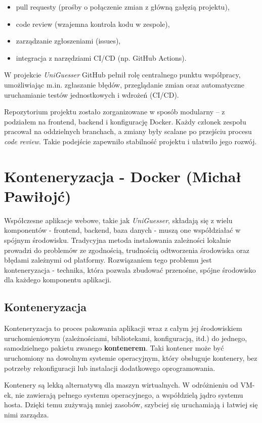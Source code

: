 \begin{itemize}
    \item pull requesty (prośby o połączenie zmian z główną gałęzią projektu),
    \item code review (wzajemna kontrola kodu w zespole),
    \item zarządzanie zgłoszeniami (issues),
    \item integracja z narzędziami CI/CD (np. GitHub Actions).
\end{itemize}

W projekcie \textit{UniGuesser} GitHub pełnił rolę centralnego punktu współpracy, umożliwiając m.in. zgłaszanie błędów, przeglądanie zmian oraz automatyczne uruchamianie testów jednostkowych i wdrożeń (CI/CD).

Repozytorium projektu zostało zorganizowane w sposób modularny – z podziałem na frontend, backend i konfigurację Docker. Każdy członek zespołu pracował na oddzielnych branchach, a zmiany były scalane po przejściu procesu \textit{code review}. Takie podejście zapewniło stabilność projektu i ułatwiło jego rozwój.

\section{Konteneryzacja - Docker (Michał Pawiłojć)}

Współczesne aplikacje webowe, takie jak \textit{UniGuesser}, składają się z wielu komponentów - frontend, backend, baza danych - muszą one współdziałać w spójnym środowisku. Tradycyjna metoda instalowania zależności lokalnie prowadzi do problemów ze zgodnością, trudnością odtworzenia środowiska oraz błędami zależnymi od platformy. Rozwiązaniem tego problemu jest konteneryzacja - technika, która pozwala zbudować przenośne, spójne środowisko dla każdego komponentu aplikacji.

\subsection{Konteneryzacja}

Konteneryzacja to proces pakowania aplikacji wraz z całym jej środowiskiem uruchomieniowym (zależnościami, bibliotekami, konfiguracją, itd.) do jednego, samodzielnego pakietu zwanego \textbf{kontenerem}. Taki kontener może być uruchomiony na dowolnym systemie operacyjnym, który obsługuje kontenery, bez potrzeby rekonfiguracji lub instalacji dodatkowego oprogramowania.

Kontenery są lekką alternatywą dla maszyn wirtualnych. W odróżnieniu od VM-ek, nie zawierają pełnego systemu operacyjnego, a współdzielą jądro systemu hosta. Dzięki temu zużywają mniej zasobów, szybciej się uruchamiają i łatwiej się nimi zarządza.

